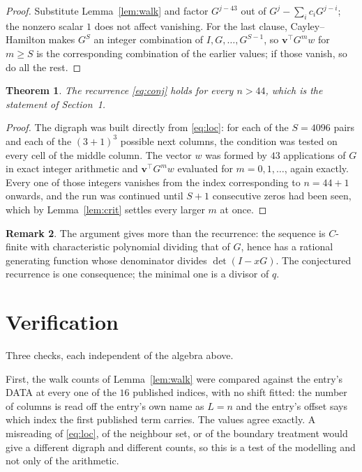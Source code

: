 \documentclass[11pt,a4paper]{article}
\theoremstyle{plain}
\newtheorem{theorem}{Theorem}
\theoremstyle{definition}
\newtheorem{remark}[theorem]{Remark}
\begin{document}
\begin{proof}
Substitute Lemma~\ref{lem:walk} and factor $G^{j-43}$ out of
$G^{j}-\sum_ic_iG^{j-i}$; the nonzero scalar $1$ does not affect
vanishing. For the last clause, Cayley--Hamilton makes $G^{S}$ an integer combination of
$I,G,\dots,G^{S-1}$, so $\mathbf{v}^{\!\top}G^{m}w$ for $m\ge S$ is the corresponding
combination of the earlier values; if those vanish, so do all the rest.
\end{proof}

\begin{theorem}
The recurrence \eqref{eq:conj} holds for every $n>44$, which is the statement of
Section~1.
\end{theorem}

\begin{proof}
The digraph was built directly from \eqref{eq:loc}: for each of the $S=4096$ pairs and each
of the $(3+1)^{3}$ possible next columns, the condition was tested on every cell of
the middle column. The vector $w$ was formed by $43$ applications of $G$ in exact integer
arithmetic and $\mathbf{v}^{\!\top}G^{m}w$ evaluated for $m=0,1,\dots$, again exactly.
Every one of those integers vanishes from the index corresponding to $n=44+1$ onwards,
and the run was continued until $S+1$ consecutive zeros had been seen, which by
Lemma~\ref{lem:crit} settles every larger $m$ at once.
\end{proof}

\begin{remark}
The argument gives more than the recurrence: the sequence is $C$-finite with characteristic
polynomial dividing that of $G$, hence has a rational generating function whose denominator
divides $\det(I-xG)$. The conjectured recurrence is one consequence; the minimal one is a
divisor of $q$.
\end{remark}

\section{Verification}

Three checks, each independent of the algebra above.

First, the walk counts of Lemma~\ref{lem:walk} were compared against the entry's DATA at
every one of the $16$ published indices, with no shift fitted: the number of columns is
read off the entry's own name as $L=n$ and the entry's offset says which index the first
published term carries. The values agree exactly. A misreading of \eqref{eq:loc}, of the
neighbour set, or of the boundary treatment would give a different digraph and different
counts, so this is a test of the modelling and not only of the arithmetic.
\end{document}
